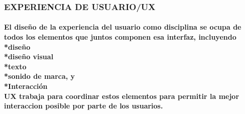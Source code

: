 \documentclass[10pt]{beamer}
\theoremstyle{remark}
\theoremstyle{definition}
\begin{document}
\begin{frame}[allowframebreaks]
    \frametitle{EXPERIENCIA DE USUARIO/UX}
    \paragraph{
    El diseño de la experiencia del usuario como disciplina se ocupa de todos los elementos que juntos componen esa interfaz, incluyendo\\
    \hfill \break
    *diseño\\
    *diseño visual\\
    *texto\\
    *sonido de marca, y\\
    *Interacción\\
    \hfill \break
    UX trabaja para coordinar estos elementos para permitir la mejor interaccion posible por parte de los usuarios.
    }
\end{frame}

\end{document}
